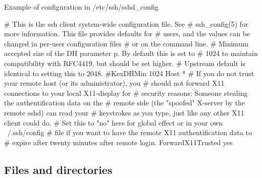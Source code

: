 \documentclass[compress, ucs, xelatex, 11pt, xcolor=svgnames, aspectratio=169,
	hyperref={
		bookmarks=true,
		unicode=true,
		colorlinks=true,
		pdftitle={Linux, command line and MetaCentrum},
		plainpages=false,
		pdfauthor={Vojtech Zeisek},
		pdfsubject={Course about use of Linux command line, writing shell scripts and using MetaCentrum of CESNET},
		pdfcreator={XeLaTeX},
		pdfkeywords={Linux, GNU, BASH, shell, command line, MetaCentrum},
		linkcolor=DarkRed, %
		anchorcolor=DarkBlue, %
		citecolor=Indigo, %
		filecolor=NavyBlue, %
		menucolor=DarkMagenta, %
		urlcolor=DarkBlue, %
		pdftex},
	url={hyphens, lowtilde} %
	]{beamer}
\begin{document}
\begin{frame}[fragile]{Example of configuration in /etc/ssh/sshd\_config}
	\begin{bashcode}
    # This is the ssh client system-wide configuration file.  See
    # ssh_config(5) for more information.  This file provides defaults for
    # users, and the values can be changed in per-user configuration files
    # or on the command line.
    # Minimum accepted size of the DH parameter p. By default this is set to
    # 1024 to maintain compatibility with RFC4419, but should be set higher.
    # Upstream default is identical to setting this to 2048.
    #KexDHMin 1024
    Host *
    # If you do not trust your remote host (or its administrator), you
    # should not forward X11 connections to your local X11-display for
    # security reasons: Someone stealing the authentification data on the
    # remote side (the "spoofed" X-server by the remote sshd) can read your
    # keystrokes as you type, just like any other X11 client could do.
    # Set this to "no" here for global effect or in your own ~/.ssh/config
    # file if you want to have the remote X11 authentification data to
    # expire after twenty minutes after remote login.
    ForwardX11Trusted yes
	\end{bashcode}
\end{frame}

\subsection{Files and directories}
\end{document}

